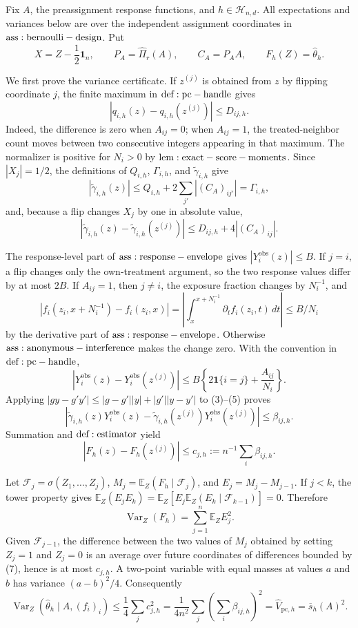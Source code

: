 Fix \(A\), the preassignment response functions, and \(h\in\mathcal H_{n,d}\).  All expectations and variances below are over the independent assignment coordinates in \({\rm ass:bernoulli-design}\).  Put
\[
 X=Z-\frac12\mathbf1_n,\qquad P_A=\widehat\Pi_r(A),\qquad C_A=P_AA,
 \qquad F_h(Z)=\widehat\theta_h.
\tag{1}
\]

We first prove the variance certificate.  If \(z^{(j)}\) is obtained from \(z\) by flipping coordinate \(j\), the finite maximum in \({\rm def:pc-handle}\) gives
\[
 |q_{i,h}(z)-q_{i,h}(z^{(j)})|\leq D_{ij,h}.
\tag{2}
\]
Indeed, the difference is zero when \(A_{ij}=0\); when \(A_{ij}=1\), the treated-neighbor count moves between two consecutive integers appearing in that maximum.  The normalizer is positive for \(N_i>0\) by \({\rm lem:exact-score-moments}\).  Since \(|X_j|=1/2\), the definitions of \(Q_{i,h}\), \(\Gamma_{i,h}\), and \(\widetilde\gamma_{i,h}\) give
\[
 |\widetilde\gamma_{i,h}(z)|
 \leq Q_{i,h}+2\sum_{j'}|(C_A)_{ij'}|=\Gamma_{i,h},
\tag{3}
\]
and, because a flip changes \(X_j\) by one in absolute value,
\[
 |\widetilde\gamma_{i,h}(z)-\widetilde\gamma_{i,h}(z^{(j)})|
 \leq D_{ij,h}+4|(C_A)_{ij}|.
\tag{4}
\]

The response-level part of \({\rm ass:response-envelope}\) gives \(|Y_i^{\mathrm{obs}}(z)|\leq B\).  If \(j=i\), a flip changes only the own-treatment argument, so the two response values differ by at most \(2B\).  If \(A_{ij}=1\), then \(j\ne i\), the exposure fraction changes by \(N_i^{-1}\), and
\[
 |f_i(z_i,x+N_i^{-1})-f_i(z_i,x)|
 =\left|\int_x^{x+N_i^{-1}}\partial_t f_i(z_i,t)\,dt\right|
 \leq B/N_i
\]
by the derivative part of \({\rm ass:response-envelope}\).  Otherwise \({\rm ass:anonymous-interference}\) makes the change zero.  With the convention in \({\rm def:pc-handle}\),
\[
 |Y_i^{\mathrm{obs}}(z)-Y_i^{\mathrm{obs}}(z^{(j)})|
 \leq B\left\{2\mathbf1\{i=j\}+\frac{A_{ij}}{N_i}\right\}.
\tag{5}
\]
Applying \(|gy-g'y'|\leq|g-g'||y|+|g'||y-y'|\) to (3)--(5) proves
\[
 |\widetilde\gamma_{i,h}(z)Y_i^{\mathrm{obs}}(z)
 -\widetilde\gamma_{i,h}(z^{(j)})Y_i^{\mathrm{obs}}(z^{(j)})|
 \leq\beta_{ij,h}.
\tag{6}
\]
Summation and \({\rm def:estimator}\) yield
\[
 |F_h(z)-F_h(z^{(j)})|
 \leq c_{j,h}:=n^{-1}\sum_i\beta_{ij,h}.
\tag{7}
\]

Let \(\mathcal F_j=\sigma(Z_1,\ldots,Z_j)\), \(M_j=\mathbb E_Z(F_h\mid\mathcal F_j)\), and \(E_j=M_j-M_{j-1}\).  If \(j<k\), the tower property gives \(\mathbb E_Z(E_jE_k)=\mathbb E_Z[E_j\mathbb E_Z(E_k\mid\mathcal F_{k-1})]=0\).  Therefore
\[
 \operatorname{Var}_Z(F_h)=\sum_{j=1}^n\mathbb E_ZE_j^2.
\tag{8}
\]
Given \(\mathcal F_{j-1}\), the difference between the two values of \(M_j\) obtained by setting \(Z_j=1\) and \(Z_j=0\) is an average over future coordinates of differences bounded by (7), hence is at most \(c_{j,h}\).  A two-point variable with equal masses at values \(a\) and \(b\) has variance \((a-b)^2/4\).  Consequently
\[
 \operatorname{Var}_Z(\widehat\theta_h\mid A,(f_i)_i)
 \leq\frac14\sum_jc_{j,h}^2
 =\frac1{4n^2}\sum_j\left(\sum_i\beta_{ij,h}\right)^2
 =\widehat V_{\mathrm{pc},h}=\overline s_h(A)^2.
\tag{9}
\]

